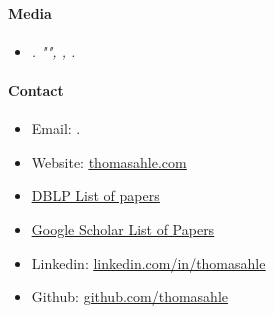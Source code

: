 \documentclass[11pt]{article}
\begin{document}
\paragraph{Media}
\begin{itemize}
   \item[]
      \emph{.
         "", , .}
\end{itemize}

\paragraph{Contact}
\begin{itemize}
   \item[]
      Email: \href{mailto:\VAR{authors['thdy'].email}}{}.
   \item[]
      Website: \href{http://www.thomasahle.com}{\underline{thomasahle.com}}
   \item[]
      \href{https://dblp1.uni-trier.de/pers/hd/a/Ahle:Thomas_D=}{\underline{DBLP List of papers}}
   \item[]
      \href{https://scholar.google.dk/citations?user=aRiVoYgAAAAJ}{\underline{Google Scholar List of Papers}}
   \item[]
      Linkedin: \href{https://www.linkedin.com/in/thomasahle/}{\underline{linkedin.com/in/thomasahle}}
   \item[]
      Github: \href{https://github.com/thomasahle}{\underline{github.com/thomasahle}}
\end{itemize}
\end{document}
